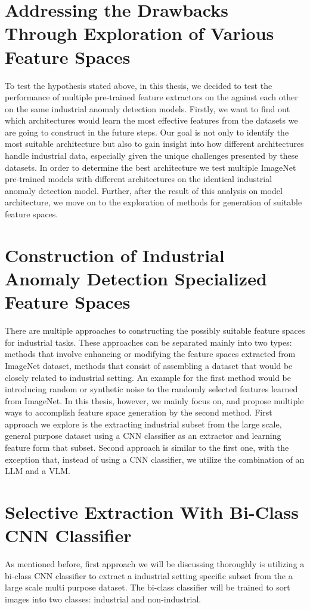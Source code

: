 \section{Addressing the Drawbacks Through Exploration of Various Feature Spaces}
\label{addressing the drawbacks}
To test the hypothesis stated above, in this thesis, we decided to test the performance of multiple pre-trained feature extractors on the against each other on the same industrial anomaly detection models. Firstly, we want to find out which architectures would learn the most effective features from the datasets we are going to construct in the future steps. Our goal is not only to identify the most suitable architecture but also to gain insight into how different architectures handle industrial data, especially given the unique challenges presented by these datasets. In order to determine the best architecture we test multiple ImageNet pre-trained models with different architectures on the identical industrial anomaly detection model. Further, after the result of this analysis on model architecture, we move on to the exploration of methods for generation of suitable feature spaces.

\section{Construction of Industrial Anomaly Detection Specialized Feature Spaces}
\label{construction}
There are multiple approaches to constructing the possibly suitable feature spaces for industrial tasks. These approaches can be separated mainly into two types: methods that involve enhancing or modifying the feature spaces extracted from ImageNet dataset, methods that consist of assembling a dataset that would be closely related to industrial setting. An example for the first method would be introducing random or synthetic noise to the randomly selected features learned from ImageNet. In this thesis, however, we mainly focus on, and propose multiple ways to accomplish feature space generation by the second method. First approach we explore is the extracting industrial subset from the large scale, general purpose dataset using a CNN classifier as an extractor and learning feature form that subset. Second approach is similar to the first one, with the exception that, instead of using a CNN classifier, we utilize the combination of an LLM and a VLM.

\section{Selective Extraction With Bi-Class CNN Classifier}
\label{cnn extraction}
As mentioned before, first approach we will be discussing thoroughly is utilizing a bi-class CNN classifier to extract a industrial setting specific subset from the a large scale multi purpose dataset. The bi-class classifier will be trained to sort images into two classes: industrial and non-industrial. 

